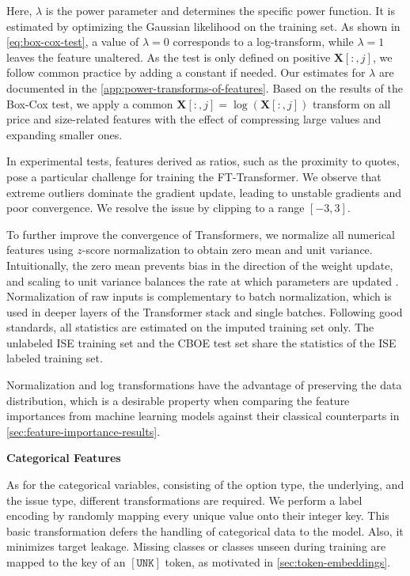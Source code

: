Here, $\lambda$ is the power parameter and determines the specific power function. It is estimated by optimizing the Gaussian likelihood on the training set. As shown in \cref{eq:box-cox-test}, a value of $\lambda=0$ corresponds to a log-transform, while $\lambda=1$ leaves the feature unaltered. As the test is only defined on positive $\mathbf{X}\left[:,j\right]$, we follow common practice by adding a constant if needed. Our estimates for $\lambda$ are documented in the \cref{app:power-transforms-of-features}. Based on the results of the Box-Cox test, we apply a common $\mathbf{X}\left[:,j\right]=\log(\mathbf{X}\left[:,j\right])$ transform on all price and size-related features with the effect of compressing large values and expanding smaller ones.

In experimental tests, features derived as ratios, such as the proximity to quotes, pose a particular challenge for training the FT-Transformer. We observe that extreme outliers dominate the gradient update, leading to unstable gradients and poor convergence. We resolve the issue by clipping to a range $[-3,3]$.

To further improve the convergence of Transformers, we normalize all numerical features using $z$-score normalization to obtain zero mean and unit variance. Intuitionally, the zero mean prevents bias in the direction of the weight update, and scaling to unit variance balances the rate at which parameters are updated \autocite[][16--17]{lecunEfficientBackProp2012}. Normalization of raw inputs is complementary to batch normalization, which is used in deeper layers of the Transformer stack and single batches. Following good standards, all statistics are estimated on the imputed training set only. The unlabeled \gls{ISE} training set and the \gls{CBOE} test set share the statistics of the \gls{ISE} labeled training set.

Normalization and log transformations have the advantage of preserving the data distribution, which is a desirable property when comparing the feature importances from machine learning models against their classical counterparts in \cref{sec:feature-importance-results}.

\textbf{Categorical Features}

As for the categorical variables, consisting of the option type, the underlying, and the issue type, different transformations are required. We perform a label encoding by randomly mapping every unique value onto their integer key. This basic transformation defers the handling of categorical data to the model. Also, it minimizes target leakage. Missing classes or classes unseen during training are mapped to the key of an $\mathtt{[UNK]}$ \gls{token}, as motivated in \cref{sec:token-embeddings}.

